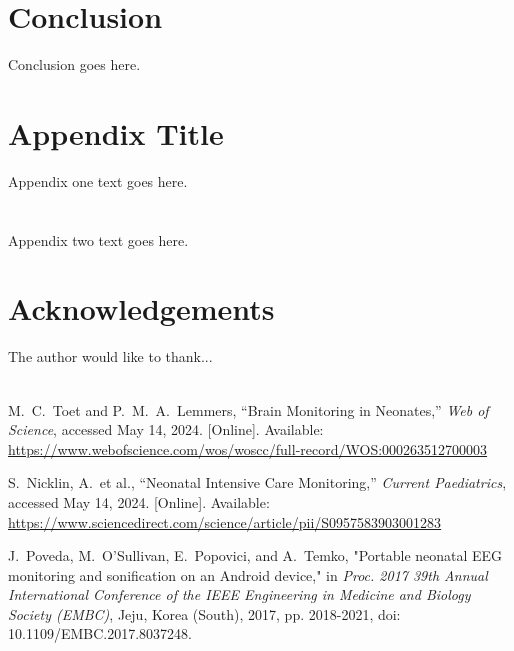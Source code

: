 \documentclass[12pt,journal,compsoc]{IEEEtran}
\begin{document}
\section{Conclusion}
Conclusion goes here.

\appendices
\section{Appendix Title}
Appendix one text goes here.

\section{}
Appendix two text goes here.


\section*{Acknowledgements}

The author would like to thank...\\ \\

\begin{thebibliography}{1}

M.~C.~Toet and P.~M.~A.~Lemmers, “Brain Monitoring in Neonates,” \emph{Web of Science}, accessed May 14, 2024. [Online]. Available: \url{https://www.webofscience.com/wos/woscc/full-record/WOS:000263512700003}

S.~Nicklin, A.~et al., “Neonatal Intensive Care Monitoring,” \emph{Current Paediatrics}, accessed May 14, 2024. [Online]. Available: \url{https://www.sciencedirect.com/science/article/pii/S0957583903001283}

J.~Poveda, M.~O'Sullivan, E.~Popovici, and A.~Temko, "Portable neonatal EEG monitoring and sonification on an Android device," in \emph{Proc. 2017 39th Annual International Conference of the IEEE Engineering in Medicine and Biology Society (EMBC)}, Jeju, Korea (South), 2017, pp. 2018-2021, doi: 10.1109/EMBC.2017.8037248.

\end{thebibliography}
\end{document}
